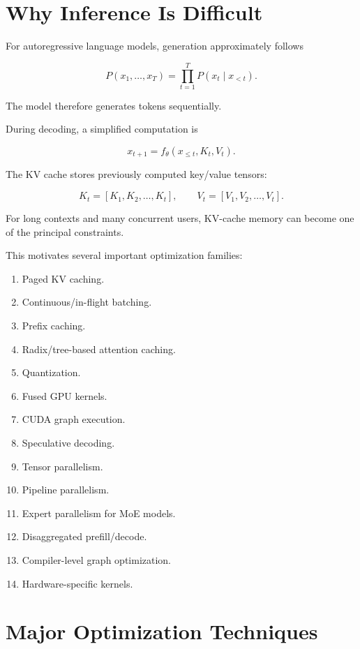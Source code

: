 \documentclass[11pt,a4paper]{article}
\begin{document}
\section{Why Inference Is Difficult}

For autoregressive language models, generation approximately follows

\[
P(x_1,\ldots,x_T)
=
\prod_{t=1}^{T}
P(x_t\mid x_{<t}).
\]

The model therefore generates tokens sequentially.

During decoding, a simplified computation is

\[
x_{t+1}
=
f_\theta(x_{\leq t},K_t,V_t).
\]

The KV cache stores previously computed key/value tensors:

\[
K_t =
[K_1,K_2,\ldots,K_t],
\qquad
V_t =
[V_1,V_2,\ldots,V_t].
\]

For long contexts and many concurrent users, KV-cache memory can
become one of the principal constraints.

This motivates several important optimization families:

\begin{enumerate}
    \item Paged KV caching.
    \item Continuous/in-flight batching.
    \item Prefix caching.
    \item Radix/tree-based attention caching.
    \item Quantization.
    \item Fused GPU kernels.
    \item CUDA graph execution.
    \item Speculative decoding.
    \item Tensor parallelism.
    \item Pipeline parallelism.
    \item Expert parallelism for MoE models.
    \item Disaggregated prefill/decode.
    \item Compiler-level graph optimization.
    \item Hardware-specific kernels.
\end{enumerate}

\section{Major Optimization Techniques}
\end{document}
